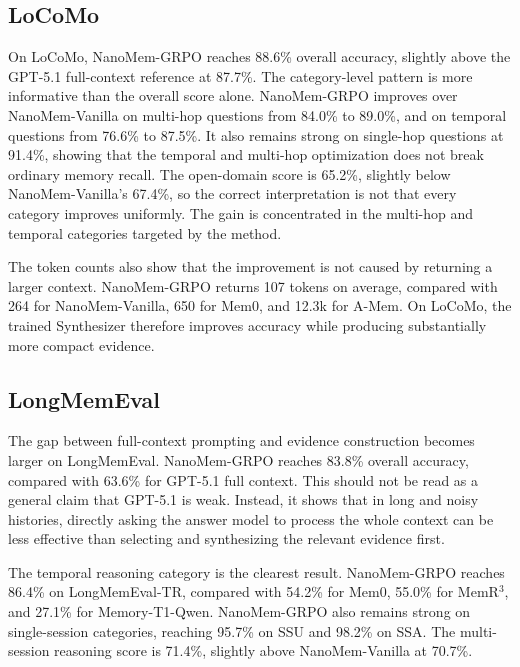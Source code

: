 

\subsection{LoCoMo}
\label{subsec:results-locomo}

On LoCoMo, NanoMem-GRPO reaches 88.6\% overall accuracy, slightly above the
GPT-5.1 full-context reference at 87.7\%. The category-level pattern is more
informative than the overall score alone. NanoMem-GRPO improves over
NanoMem-Vanilla on multi-hop questions from 84.0\% to 89.0\%, and on temporal
questions from 76.6\% to 87.5\%. It also remains strong on single-hop questions
at 91.4\%, showing that the temporal and multi-hop optimization does not break
ordinary memory recall. The open-domain score is 65.2\%, slightly below
NanoMem-Vanilla's 67.4\%, so the correct interpretation is not that every
category improves uniformly. The gain is concentrated in the multi-hop and
temporal categories targeted by the method.



The token counts also show that the improvement is not caused by returning a
larger context. NanoMem-GRPO returns 107 tokens on average, compared with 264
for NanoMem-Vanilla, 650 for Mem0, and 12.3k for A-Mem. On LoCoMo, the trained
Synthesizer therefore improves accuracy while producing substantially more
compact evidence.

\subsection{LongMemEval}
\label{subsec:results-longmemeval}

The gap between full-context prompting and evidence construction becomes larger
on LongMemEval. NanoMem-GRPO reaches 83.8\% overall accuracy, compared with
63.6\% for GPT-5.1 full context. This should not be read as a general claim
that GPT-5.1 is weak. Instead, it shows that in long and noisy histories,
directly asking the answer model to process the whole context can be less
effective than selecting and synthesizing the relevant evidence first.

The temporal reasoning category is the clearest result. NanoMem-GRPO reaches
86.4\% on LongMemEval-TR, compared with 54.2\% for Mem0, 55.0\% for
MemR$^3$, and 27.1\% for Memory-T1-Qwen. NanoMem-GRPO also remains strong on
single-session categories, reaching 95.7\% on SSU and 98.2\% on SSA. The
multi-session reasoning score is 71.4\%, slightly above NanoMem-Vanilla at
70.7\%.

